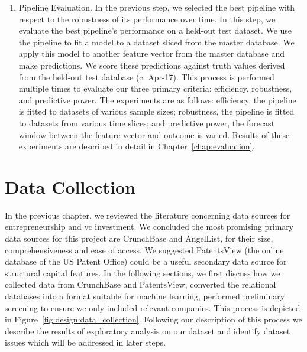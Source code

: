 \documentclass[../thesis/thesis.tex]{subfiles}
\begin{document}
\begin{enumerate}
\item Pipeline Evaluation. In the previous step, we selected the best pipeline with respect to the robustness of its performance over time. In this step, we evaluate the best pipeline's performance on a held-out test dataset. We use the pipeline to fit a model to a dataset sliced from the master database. We apply this model to another feature vector from the master database and make predictions. We score these predictions against truth values derived from the held-out test database (c. Apr-17). This process is performed multiple times to evaluate our three primary criteria: efficiency, robustness, and predictive power. The experiments are as follows: efficiency, the pipeline is fitted to datasets of various sample sizes; robustness, the pipeline is fitted to datasets from various time slices; and predictive power, the forecast window between the feature vector and outcome is varied. Results of these experiments are described in detail in Chapter~\ref{chap:evaluation}.

\end{enumerate}

\section{Data Collection}

In the previous chapter, we reviewed the literature concerning data sources for entrepreneurship and \gls{vc} investment. We concluded the most promising primary data sources for this project are CrunchBase and AngelList, for their size, comprehensiveness and ease of access. We suggested PatentsView (the online database of the US Patent Office) could be a useful secondary data source for structural capital features. In the following sections, we first discuss how we collected data from CrunchBase and PatentsView, converted the relational databases into a format suitable for machine learning, performed preliminary screening to ensure we only included relevant companies. This process is depicted in Figure~\ref{fig:design:data_collection}. Following our description of this process we describe the results of exploratory analysis on our dataset and identify dataset issues which will be addressed in later steps.
\end{document}

